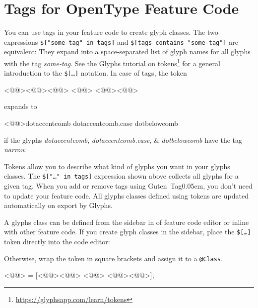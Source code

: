 \section{Tags for OpenType Feature Code}%
\label{sec:tags_for_opentype_feature_code}

You can use tags in your feature code to create glyph classes.
The two expressions \texttt{\$["some-tag" in tags]} and \texttt{\$[tags contains "some-tag"]} are equivalent:
They expand into a space-separated list of glyph names for all glyphs with the tag \emph{some-tag}.
See the Glyphs tutorial on tokens\footnote{\url{https://glyphsapp.com/learn/tokens}} for a general introduction to the \texttt{\$[…]} notation.
In case of tags, the token

\begin{RichListing}
<@\hspace{\parindent}@><@\Token{\$[}@><@@> <@@> <@@><@\Token{]}@>
\end{RichListing}

\noindent expands to

\begin{RichListing}
<@\hspace{\parindent}@>dotaccentcomb dotaccentcomb.case dotbelowcomb
\end{RichListing}

\noindent if the glyphs \emph{dotaccentcomb}, \emph{dotaccentcomb.case}, \& \emph{dotbelowcomb} have the tag \emph{narrow}.

Tokens allow you to describe what kind of glyphs you want in your glyphs classes.
The \texttt{\$["…" in tags]} expression shown above collects all glyphs for a given tag.
When you add or remove tags using Guten~Tag\kern0.05em, you don’t need to update your feature code.
All glyphs classes defined using tokens are updated automatically on export by Glyphs.

A glyphs class can be defined from the sidebar in of feature code editor or inline with other feature code.
If you create glyph classes in the sidebar, place the \texttt{\$[…]} token directly into the code editor:

\bigbreak\noindent{}

\noindent Otherwise, wrap the token in square brackets and assign it to a \texttt{@Class}.

\begin{RichListing}
<@@> = [<@\Token{\$[}@><@@> <@@> <@@><@\Token{]}@>];
\end{RichListing}

